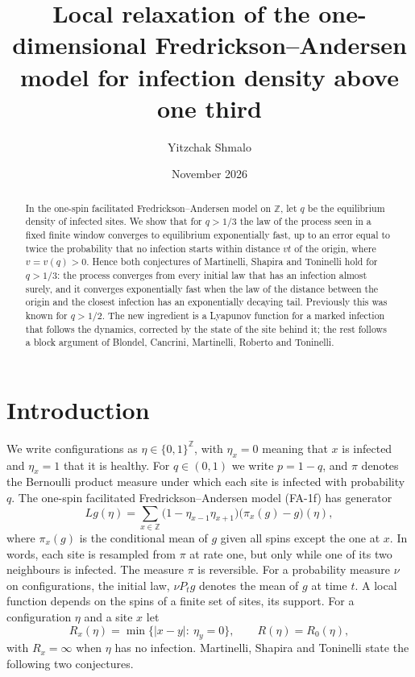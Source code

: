 \documentclass[11pt]{amsart}
\title[FA-1f above density one third]{Local relaxation of the one-dimensional Fredrickson--Andersen model for
infection density above one third}
\author{Yitzchak Shmalo}
\date{November 2026}
\theoremstyle{definition}
\theoremstyle{remark}
\newcommand{\Z}{\mathbb{Z}}
\begin{document}
\begin{abstract}
In the one-spin facilitated Fredrickson--Andersen model on $\Z$, let $q$ be the equilibrium density of infected sites.
We show that for $q>1/3$ the law of the process seen in a fixed finite window converges to equilibrium exponentially
fast, up to an error equal to twice the probability that no infection starts within distance $vt$ of the origin, where
$v=v(q)>0$. Hence both conjectures of Martinelli, Shapira and Toninelli hold for $q>1/3$: the process converges from every initial law that has an infection almost surely, and it converges
exponentially fast when the law of the distance between the origin and the closest infection has an exponentially
decaying tail. Previously this was known for $q>1/2$. The new
ingredient is a Lyapunov function for a marked infection that follows the dynamics, corrected by the state of the site
behind it; the rest follows a block argument of Blondel, Cancrini, Martinelli, Roberto and
Toninelli.
\end{abstract}
\maketitle

\section{Introduction}\label{sec:intro}

We write configurations as $\eta\in\{0,1\}^{\Z}$, with $\eta_x=0$ meaning that $x$ is infected and $\eta_x=1$ that it
is healthy. For $q\in(0,1)$ we write $p=1-q$, and $\pi$ denotes the Bernoulli product measure under which each site is
infected with probability $q$. The one-spin facilitated Fredrickson--Andersen model (FA-1f) \cite{FA84} has generator
\begin{equation}\label{eq:gen}
Lg(\eta)=\sum_{x\in\Z}\bigl(1-\eta_{x-1}\eta_{x+1}\bigr)\bigl(\pi_x(g)-g\bigr)(\eta),
\end{equation}
where $\pi_x(g)$ is the conditional mean of $g$ given all spins except the one at $x$. In words, each site is resampled
from $\pi$ at rate one, but only while one of its two neighbours is infected. The measure $\pi$ is reversible. For a
probability measure $\nu$ on configurations, the initial law, $\nu P_t g$ denotes the mean of $g$ at time $t$. A local
function depends on the spins of a finite set of sites, its support. For a configuration $\eta$ and a site $x$ let
\[
R_x(\eta)=\min\{|x-y|:\ \eta_y=0\},\qquad R(\eta)=R_0(\eta),
\]
with $R_x=\infty$ when $\eta$ has no infection. Martinelli, Shapira and Toninelli \cite[Section~1.1]{MST25} state the
following two conjectures.
\end{document}
